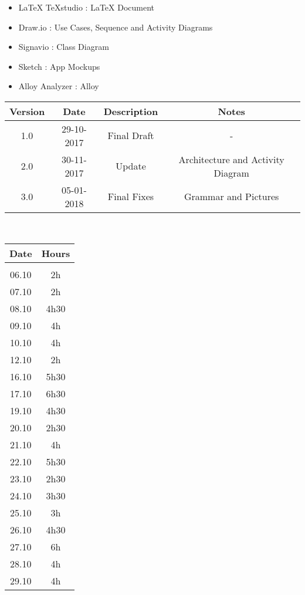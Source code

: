 \begin{itemize}
	\setlength{\leftskip}{1cm}
	\item LaTeX TeXstudio : LaTeX Document
	\item Draw.io : Use Cases, Sequence and Activity Diagrams
	\item Signavio : Class Diagram
	\item Sketch : App Mockups
	\item Alloy Analyzer : Alloy
\end{itemize}

\vspace{0.5cm}
\begin{tabular}[H]{c|c|c|c}
	Version & Date & Description & Notes\\
	\hline
	\rule{0pt}{4ex}1.0	&	29-10-2017	&	Final Draft	&	-\\
	\rule{0pt}{4ex}2.0	&	30-11-2017	&	Update	&	Architecture and Activity Diagram\\
	\rule{0pt}{4ex}3.0	&	05-01-2018	&	Final Fixes	&	Grammar and Pictures
\end{tabular}
\vspace{0.5cm}\\

\vspace{0.5cm}
\begin{tabular}[H]{cc}
	Date & Hours\\
	\hline\\
	06.10	&	2h\\
	07.10	&	2h\\
	08.10	&	4h30\\
	09.10	&	4h\\
	10.10	&	4h\\
	12.10	&	2h\\
	16.10	&	5h30\\
	17.10	&	6h30\\
	19.10	&	4h30\\
	20.10	&	2h30\\
	21.10	&	4h\\
	22.10	&	5h30\\
	23.10	&	2h30\\
	24.10	&	3h30\\
	25.10	&	3h\\
	26.10	&	4h30\\
	27.10	&	6h\\
	28.10	&	4h\\
	29.10	&	4h
\end{tabular}

